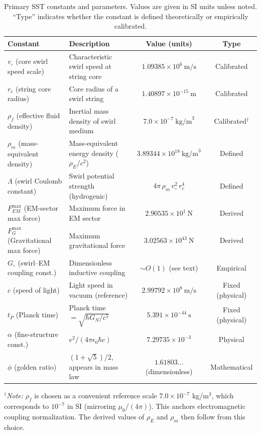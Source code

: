 \documentclass[reprint,aps,onecolumn,nofootinbib]{revtex4-2}
\begin{document}
	\begin{table}[ht]
		\caption{Primary SST constants and parameters. Values are given in SI units unless noted. “Type” indicates whether the constant is defined theoretically or empirically calibrated.}
		\label{tab:constants}
		\begin{ruledtabular}
			\begin{tabular}{llcc}
				\textbf{Constant} & \textbf{Description} & \textbf{Value (units)} & \textbf{Type} \\
				\hline
				$v_{\circ}$ (core swirl speed scale) & Characteristic swirl speed at string core & $1.09385\times 10^6~\text{m/s}$ & Calibrated \\
				$r_c$ (string core radius)    & Core radius of a swirl string & $1.40897\times 10^{-15}~\text{m}$ & Calibrated  \\
				$\rho_f$ (effective fluid density) & Inertial mass density of swirl medium & $7.0\times10^{-7}~\text{kg/m}^3$ & Calibrated$^{\dagger}$ \\
				$\rho_m$ (mass-equivalent density) & Mass-equivalent energy density ($\rho_E/c^2$) & $3.89344\times10^{18}~\text{kg/m}^3$ & Defined \\
				$\Lambda$ (swirl Coulomb constant) & Swirl potential strength (hydrogenic) & $4\pi\,\rho_m\,v_{\circ}^2\,r_c^4$ & Defined \\
				$F_{\!EM}^{\max}$ (EM-sector max force) & Maximum force in EM sector & $2.90535\times10^{1}~\text{N}$ & Derived \\
				$F_{\!G}^{\max}$ (Gravitational max force) & Maximum gravitational force & $3.02563\times10^{43}~\text{N}$ & Derived \\
				$G_{\circ}$ (swirl–EM coupling const.) & Dimensionless inductive coupling & $\sim O(1)$ (see text) & Empirical \\
				\hline
				$c$ (speed of light) & Light speed in vacuum (reference) & $2.99792\times10^8~\text{m/s}$ & Fixed (physical) \\
				$t_P$ (Planck time) & Planck time $=\sqrt{\hbar G_N/c^5}$ & $5.391\times10^{-44}~\text{s}$ & Fixed (physical) \\
				$\alpha$ (fine-structure const.) & $e^2/(4\pi\epsilon_0\hbar c)$ & $7.29735\times10^{-3}$ & Physical \\
				$\phi$ (golden ratio) & $(1+\sqrt{5})/2$, appears in mass law & $1.61803\ldots$ (dimensionless) & Mathematical \\
			\end{tabular}
		\end{ruledtabular}
		\begin{flushleft}
		{\footnotesize $^{\dagger}$\textit{Note:} $\rho_f$ is chosen as a convenient reference scale $7.0\times10^{-7}$ kg/m$^3$, which corresponds to $10^{-7}$ in SI (mirroring $\mu_0/(4\pi)$). This anchors electromagnetic coupling normalization. The derived values of $\rho_E$ and $\rho_m$ then follow from this choice.}
		\end{flushleft}
	\end{table}
\end{document}
